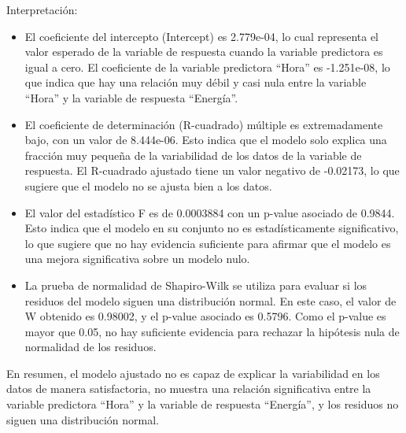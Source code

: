 \documentclass[
]{article}
\begin{document}
Interpretación:

\begin{itemize}
\item
  El coeficiente del intercepto (Intercept) es 2.779e-04, lo cual
  representa el valor esperado de la variable de respuesta cuando la
  variable predictora es igual a cero. El coeficiente de la variable
  predictora ``Hora'' es -1.251e-08, lo que indica que hay una relación
  muy débil y casi nula entre la variable ``Hora'' y la variable de
  respuesta ``Energía''.
\item
  El coeficiente de determinación (R-cuadrado) múltiple es
  extremadamente bajo, con un valor de 8.444e-06. Esto indica que el
  modelo solo explica una fracción muy pequeña de la variabilidad de los
  datos de la variable de respuesta. El R-cuadrado ajustado tiene un
  valor negativo de -0.02173, lo que sugiere que el modelo no se ajusta
  bien a los datos.
\item
  El valor del estadístico F es de 0.0003884 con un p-value asociado de
  0.9844. Esto indica que el modelo en su conjunto no es
  estadísticamente significativo, lo que sugiere que no hay evidencia
  suficiente para afirmar que el modelo es una mejora significativa
  sobre un modelo nulo.
\item
  La prueba de normalidad de Shapiro-Wilk se utiliza para evaluar si los
  residuos del modelo siguen una distribución normal. En este caso, el
  valor de W obtenido es 0.98002, y el p-value asociado es 0.5796. Como
  el p-value es mayor que 0.05, no hay suficiente evidencia para
  rechazar la hipótesis nula de normalidad de los residuos.
\end{itemize}

En resumen, el modelo ajustado no es capaz de explicar la variabilidad
en los datos de manera satisfactoria, no muestra una relación
significativa entre la variable predictora ``Hora'' y la variable de
respuesta ``Energía'', y los residuos no siguen una distribución normal.
\end{document}
